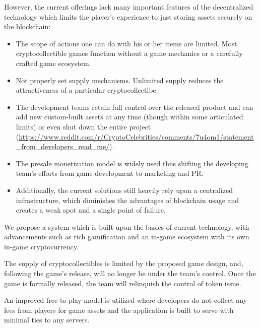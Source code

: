 \documentclass[12pt]{article}
\begin{document}
However, the current offerings lack many important features of the decentralized technology which limits the player’s experience to just storing assets securely on the blockchain:\par

\begin{itemize}
	\item The scope of actions one can do with his or her items are limited. Most cryptocollectible games function without a game mechanics or a carefully crafted game ecosystem.\par

	\item Not properly set supply mechanisms. Unlimited supply reduces the attractiveness of a particular cryptocollectibe.\par

	\item The development teams retain full control over the released product and can add new custom-built assets at any time (though within some articulated limits) or even shut down the entire project (\url{https://www.reddit.com/r/CryptoCelebrities/comments/7u4om1/statement\_from\_developers\_read\_me/}).\par

	\item The presale monetization model is widely used thus shifting the developing team’s efforts from game development to marketing and PR.\par

	\item Additionally, the current solutions still heavily rely upon a centralized infrastructure, which diminishes the advantages of blockchain usage and creates a weak spot and a single point of failure.
\end{itemize}\par

We propose a system which is built upon the basics of current technology, with advancements such as rich gamification and an in-game ecosystem with its own in-game cryptocurrency.\par

The supply of cryptocollectibles is limited by the proposed game design, and, following the game’s release, will no longer be under the team’s control. Once the game is formally released, the team will relinquish the control of token issue.\par

An improved free-to-play model is utilized where developers do not collect any fees from players for game assets and the application is built to serve with minimal ties to any servers.\par
\end{document}
